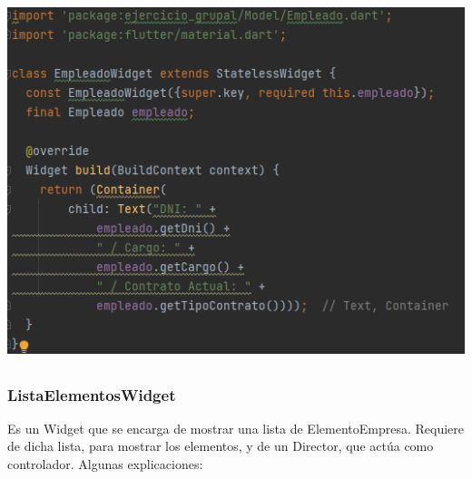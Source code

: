 \documentclass[
]{article}
\begin{document}
\includegraphics[width=5.40625in,height=4.10417in]{imagenes/EmpleadoWidget.png}

\subsubsection{ListaElementosWidget}\label{listaelementoswidget}

Es un Widget que se encarga de mostrar una lista de ElementoEmpresa.
Requiere de dicha lista, para mostrar los elementos, y de un Director,
que actúa como controlador. Algunas explicaciones:
\end{document}
